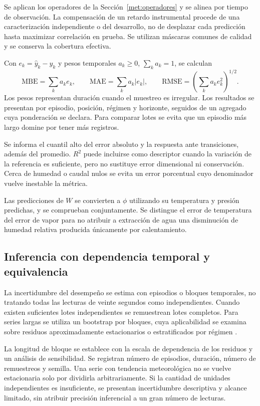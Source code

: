 Se aplican los operadores de la Sección~\ref{met:operadores} y se alinea por tiempo de observación. La compensación de un retardo instrumental procede de una caracterización independiente o del desarrollo, no de desplazar cada predicción hasta maximizar correlación en prueba. Se utilizan máscaras comunes de calidad y se conserva la cobertura efectiva.

Con $e_k=\widehat y_k-y_k$ y pesos temporales $a_k\geq0$, $\sum_k a_k=1$, se calculan
\begin{equation}
\mathrm{MBE}=\sum_k a_ke_k,\qquad
\mathrm{MAE}=\sum_k a_k|e_k|,\qquad
\mathrm{RMSE}=\left(\sum_k a_ke_k^2\right)^{1/2}.
\label{met:errores}
\end{equation}
Los pesos representan duración cuando el muestreo es irregular. Los resultados se presentan por episodio, posición, régimen y horizonte, seguidos de un agregado cuya ponderación se declara. Para comparar lotes se evita que un episodio más largo domine por tener más registros.

Se informa el cuantil alto del error absoluto y la respuesta ante transiciones, además del promedio. $R^2$ puede incluirse como descriptor cuando la variación de la referencia es suficiente, pero no sustituye error dimensional ni conservación. Cerca de humedad o caudal nulos se evita un error porcentual cuyo denominador vuelve inestable la métrica.

Las predicciones de $W$ se convierten a $\phi$ utilizando su temperatura y presión predichas, y se comprueban conjuntamente. Se distingue el error de temperatura del error de vapor para no atribuir a extracción de agua una disminución de humedad relativa producida únicamente por calentamiento.

\subsection{Inferencia con dependencia temporal y equivalencia}
\label{met:estadistica}

La incertidumbre del desempeño se estima con episodios o bloques temporales, no tratando todas las lecturas de veinte segundos como independientes. Cuando existen suficientes lotes independientes se remuestrean lotes completos. Para series largas se utiliza un bootstrap por bloques, cuya aplicabilidad se examina sobre residuos aproximadamente estacionarios o estratificados por régimen \cite{kunsch1989}.

La longitud de bloque se establece con la escala de dependencia de los residuos y un análisis de sensibilidad. Se registran número de episodios, duración, número de remuestreos y semilla. Una serie con tendencia meteorológica no se vuelve estacionaria solo por dividirla arbitrariamente. Si la cantidad de unidades independientes es insuficiente, se presentan incertidumbre descriptiva y alcance limitado, sin atribuir precisión inferencial a un gran número de lecturas.

